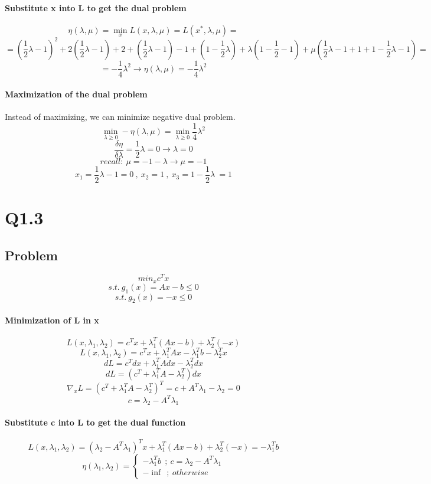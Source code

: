 \documentclass[12pt]{article}
\begin{document}
\paragraph{Substitute x into L to get the dual problem}
\[\eta(\lambda , \mu) = \min_x L(x, \lambda, \mu) = L(x^*, \lambda, \mu) = \]
\[= (\frac{1}{2} \lambda - 1)^2 +2(\frac{1}{2} \lambda - 1)+2+(\frac{1}{2} \lambda - 1)-1+(1 - \frac{1}{2} \lambda)+ \lambda(1 - \frac{1}{2} - 1) + \mu(\frac{1}{2} \lambda - 1 + 1 + 1 - \frac{1}{2} \lambda - 1) = \]
\[= - \frac{1}{4} \lambda ^2 \longrightarrow \eta(\lambda , \mu) = - \frac{1}{4} \lambda ^2\]
\paragraph{Maximization of the dual problem}
Instead of maximizing, we can minimize negative dual problem.
\[ \min_{\lambda \geq 0} -\eta(\lambda , \mu) = \min_{\lambda \geq 0} \frac{1}{4} \lambda ^2\]
\[\frac{\delta \eta}{\delta \lambda} = \frac{1}{2} \lambda = 0 \longrightarrow \lambda=0 \]
\[recall: \ \mu = -1 - \lambda \longrightarrow \mu = -1\]
\[x_1 = \frac{1}{2} \lambda -1 = 0 \ , \ x_2 =1 \ , \ x_3 = 1 - \frac{1}{2} \lambda\ = 1\]

\newpage
\section{Q1.3}
\subsection{Problem}
\[min_x c^T x\]
\[s.t. \ g_1 (x) = Ax-b \leq 0 \]
\[s.t. \ g_2 (x) = -x \leq 0 \]

\paragraph{Minimization of L in x}
\[L(x,\lambda_1, \lambda_2) = c^T x + \lambda_1 ^T (Ax-b) + \lambda_2 ^T (-x)\]
\[L(x,\lambda_1, \lambda_2) = c^T x + \lambda_1 ^T Ax - \lambda_1 ^T b - \lambda_2 ^T x\]
\[dL = c^T dx + \lambda_1 ^T A dx - \lambda_2 ^ T dx \]
\[dL = (c^T + \lambda_1 ^T A - \lambda_2 ^T)dx \]
\[\nabla_x L = (c^T + \lambda_1 ^T A - \lambda_2 ^T)^T = c+A^T \lambda_1 - \lambda_2 =0\]
\[c=\lambda_2 - A^T \lambda_1\]
\paragraph{Substitute c into L to get the dual function}
\[L(x,\lambda_1, \lambda_2) = (\lambda_2 - A^T \lambda_1)^T x + \lambda_1 ^T (Ax-b) + \lambda_2 ^T (-x) = -\lambda_1 ^T b\]
  \[
    \eta(\lambda_1 , \lambda_2) =\left\{
                \begin{array}{ll}
                  -\lambda_1 ^T b \ \ ; \ c=\lambda_2 - A^T \lambda_1 \\
                  - \inf \ \ ; \ otherwise
                \end{array}
              \right.
  \]
\end{document}
